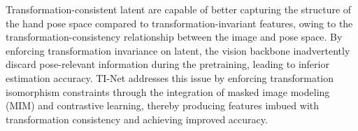 Transformation-consistent latent are capable of better capturing the structure of the hand pose space compared to transformation-invariant features, owing to the transformation-consistency relationship between the image and pose space. By enforcing transformation invariance on latent, the vision backbone inadvertently discard pose-relevant information during the pretraining, leading to inferior estimation accuracy. TI-Net addresses this issue by enforcing transformation isomorphism constraints through the integration of masked image modeling (MIM) and contrastive learning, thereby producing features imbued with transformation consistency and achieving improved accuracy.


